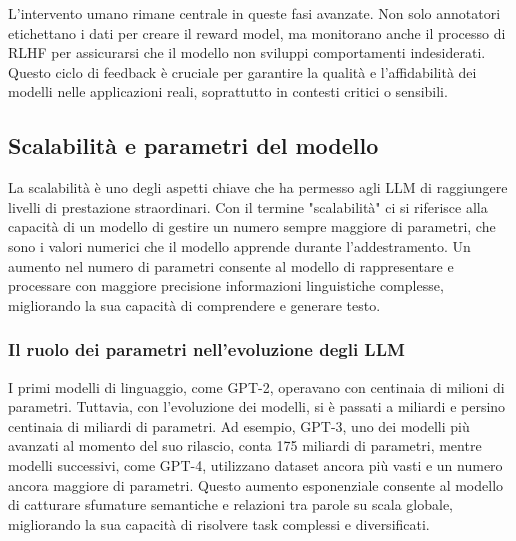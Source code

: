 \documentclass[target=mst,aauheader=,style=]{thud}
\begin{document}
L'intervento umano rimane centrale in queste fasi avanzate. Non solo annotatori etichettano i dati per creare il reward model, ma monitorano anche il processo di RLHF per assicurarsi che il modello non sviluppi comportamenti indesiderati. Questo ciclo di feedback è cruciale per garantire la qualità e l'affidabilità dei modelli nelle applicazioni reali, soprattutto in contesti critici o sensibili.

\subsection{Scalabilità e parametri del modello}
La scalabilità è uno degli aspetti chiave che ha permesso agli LLM di raggiungere livelli di prestazione straordinari. Con il termine "scalabilità" ci si riferisce alla capacità di un modello di gestire un numero sempre maggiore di parametri, che sono i valori numerici che il modello apprende durante l’addestramento. Un aumento nel numero di parametri consente al modello di rappresentare e processare con maggiore precisione informazioni linguistiche complesse, migliorando la sua capacità di comprendere e generare testo.

\subsubsection{Il ruolo dei parametri nell'evoluzione degli LLM}
I primi modelli di linguaggio, come GPT-2, operavano con centinaia di milioni di parametri. Tuttavia, con l’evoluzione dei modelli, si è passati a miliardi e persino centinaia di miliardi di parametri. Ad esempio, GPT-3, uno dei modelli più avanzati al momento del suo rilascio, conta 175 miliardi di parametri, mentre modelli successivi, come GPT-4, utilizzano dataset ancora più vasti e un numero ancora maggiore di parametri. Questo aumento esponenziale consente al modello di catturare sfumature semantiche e relazioni tra parole su scala globale, migliorando la sua capacità di risolvere task complessi e diversificati.
\end{document}
